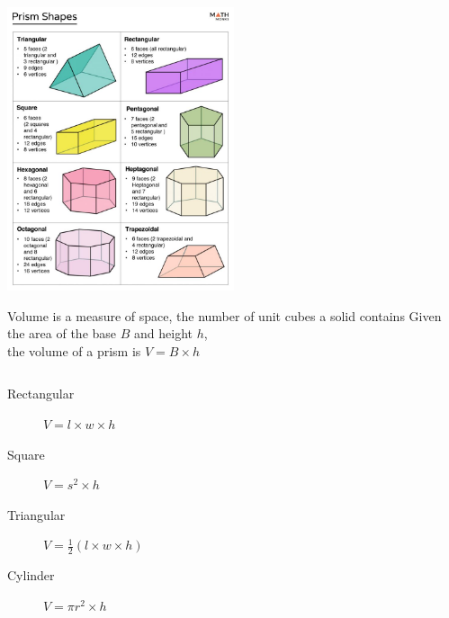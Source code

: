 \documentclass[onlytextwidth, aspectratio=169]{beamer}
\begin{document}
\begin{frame}
  \includegraphics[width=0.5\textwidth]{../graphics/prism-shapes-768x960.jpeg}
\end{frame}

\begin{frame}{Volume is a measure of space, the number of unit cubes a solid contains}
  Given the area of the base $B$ and height $h$, \\
  the volume of a prism is $V= B \times h$
  \vspace{0.5cm}
  \begin{columns}
    \begin{description}
      \item[Rectangular] $V= l \times w \times h$
      \item[Square] $V= s^2 \times h$
      \item[Triangular] $V= \frac{1}{2} (l \times w \times h)$
      \item[Cylinder] $V= \pi r^2 \times h$ 
    \end{description}
  \end{columns} \vspace{0.5cm}
  \end{frame}
\end{document}
